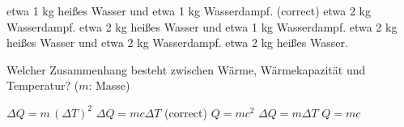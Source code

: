 \documentclass[11pt]{exam}
\begin{document}
\begin{questions}
\begin{choices}
	\choice etwa 1 kg heißes Wasser und etwa 1 kg Wasserdampf. (correct)
	\choice etwa 2 kg Wasserdampf.
	\choice etwa 2 kg heißes Wasser und etwa 1 kg Wasserdampf.
	\choice etwa 2 kg heißes Wasser und etwa 2 kg Wasserdampf.
	\choice etwa 2 kg heißes Wasser.
\end{choices}

\vspace{3mm}\question Welcher Zusammenhang besteht zwischen Wärme, Wärmekapazität und Temperatur? (\(m\): Masse)

\begin{choices}
	\choice \(\Delta Q = m \, (\Delta T)^2\)
	\choice \(\Delta Q = m c \Delta T\) (correct)
	\choice \(Q = m c^2\)
	\choice \(\Delta Q = m \Delta T\)
	\choice \(Q = m c\)
\end{choices}

\vspace{3mm}\end{questions}
\end{document}
